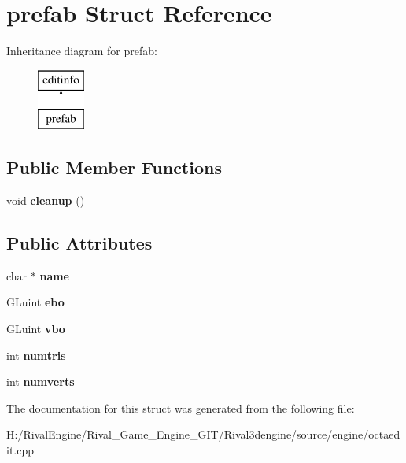 \hypertarget{structprefab}{}\section{prefab Struct Reference}
\label{structprefab}
Inheritance diagram for prefab\+:\begin{figure}[H]
\begin{center}
\leavevmode
\includegraphics[height=2.000000cm]{structprefab}
\end{center}
\end{figure}
\subsection*{Public Member Functions}
\begin{DoxyCompactItemize}
\item 
\mbox{\label{structprefab_a9b90d1a3d59cb498ca5015f3076b6d7b}} 
void {\bfseries cleanup} ()
\end{DoxyCompactItemize}
\subsection*{Public Attributes}
\begin{DoxyCompactItemize}
\item 
\mbox{\label{structprefab_a579adf73ce7774ea7928f67a8c6b28df}} 
char $\ast$ {\bfseries name}
\item 
\mbox{\label{structprefab_a153b2bcaa04fe31b270080e9b98fc52d}} 
G\+Luint {\bfseries ebo}
\item 
\mbox{\label{structprefab_ab5c3a4095b0970b1926440ec9a8cead4}} 
G\+Luint {\bfseries vbo}
\item 
\mbox{\label{structprefab_a5d4eece583923bbd24f98999ce3e5e76}} 
int {\bfseries numtris}
\item 
\mbox{\label{structprefab_abf59822172c20b2e562a9be961c4ecc8}} 
int {\bfseries numverts}
\end{DoxyCompactItemize}


The documentation for this struct was generated from the following file\+:\begin{DoxyCompactItemize}
\item 
H\+:/\+Rival\+Engine/\+Rival\+\_\+\+Game\+\_\+\+Engine\+\_\+\+G\+I\+T/\+Rival3dengine/source/engine/octaedit.\+cpp\end{DoxyCompactItemize}
